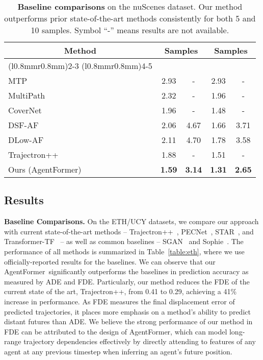 \documentclass[10pt,twocolumn,letterpaper]{article}
\newcommand{\mname}{AgentFormer}
\begin{document}
\begin{table}[t]
\footnotesize
\centering
\begin{tabular}{@{\hskip 1mm}l@{\hskip 1mm}|cccc}
\toprule
\multicolumn{1}{c|}{\multirow{3}{*}[2pt]{Method}} & \multicolumn{2}{c}{ Samples} & \multicolumn{2}{c}{ Samples}\\
\cmidrule(l{0.8mm}r{0.8mm}){2-3}
\cmidrule(l{0.8mm}r{0.8mm}){4-5}
 &  &  &  & \\ \midrule MTP~\cite{cui2019multimodal} & 2.93 & - & 2.93 & - \\
MultiPath~\cite{chai2020multipath} & 2.32 & - & 1.96 & - \\
CoverNet~\cite{phan2020covernet} & 1.96 & - & 1.48 & - \\
DSF-AF~\cite{ma2020diverse} & 2.06 & 4.67 & 1.66 & 3.71 \\
DLow-AF~\cite{yuan2020dlow} & 2.11 & 4.70 & 1.78 & 3.58 \\
Trajectron++~\cite{salzmann2020trajectron++} & 1.88 & - & 1.51 & - \\
Ours (\mname) & \textbf{1.59} & \textbf{3.14} & \textbf{1.31} & \textbf{2.65} \\
\bottomrule
\end{tabular}
\vspace{1.5mm}
\caption{\textbf{Baseline comparisons} on the nuScenes dataset. Our method outperforms prior state-of-the-art methods consistently for both 5 and 10 samples. Symbol ``-'' means results are not available.}
\label{table:nuscene}
\vspace{-3.5mm}
\end{table} 
\subsection{Results}
\noindent\textbf{Baseline Comparisons.}
On the ETH/UCY datasets, we compare our approach with current state-of-the-art methods -- Trajectron++~\cite{salzmann2020trajectron++}, PECNet~\cite{mangalam2020not}, STAR~\cite{yu2020spatio}, and Transformer-TF~\cite{giuliari2020transformer} -- as well as common baselines -- SGAN~\cite{gupta2018social} and Sophie~\cite{sadeghian2019sophie}. The performance of all methods is summarized in Table~\ref{table:eth}, where we use officially-reported results for the baselines. We can observe that our \mname\ significantly outperforms the baselines in prediction accuracy as measured by ADE and FDE. Particularly, our method reduces the FDE of the current state of the art, Trajectron++, from 0.41 to 0.29, achieving a 41\% increase in performance. As FDE measures the final displacement error of predicted trajectories, it places more emphasis on a method's ability to predict distant futures than ADE. We believe the strong performance of our method in FDE can be attributed to the design of \mname, which can model long-range trajectory dependencies effectively by directly attending to features of any agent at any previous timestep when inferring an agent's future position.
\end{document}
